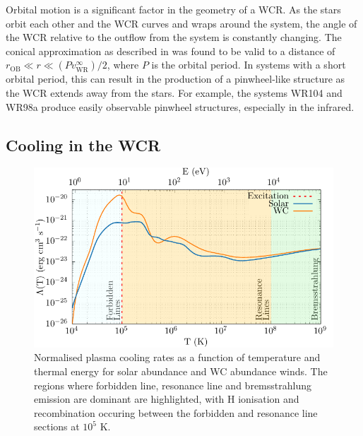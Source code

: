 Orbital motion is a significant factor in the geometry of a WCR.
As the stars orbit each other and the WCR curves and wraps around the system, the angle of the WCR relative to the outflow from the system is constantly changing.
The conical approximation as described in \textcite{eichler_particle_1993} was found to be valid to a distance of $r_\text{OB} \ll r \ll (P v^\infty_\text{WR})/2$, where $P$ is the orbital period.
In systems with a short orbital period, this can result in the production of a pinwheel-like structure as the WCR extends away from the stars.
For example, the systems WR104 and WR98a produce easily observable pinwheel structures, especially in the infrared.

\subsection{Cooling in the WCR}
\label{sec:wcrcooling}
\begin{figure}[h]
  \centering
  \includegraphics{assets/cooling-breakdown/cooling-curve-solar-withev.pdf}
  \caption[WC \& solar abundance plasma cooling curves]{Normalised plasma cooling rates as a function of temperature and thermal energy for solar abundance and WC abundance winds. The regions where forbidden line, resonance line and bremsstrahlung emission are dominant are highlighted, with H ionisation and recombination occuring between the forbidden and resonance line sections at $10^5$ \si{\kelvin}.}
  \label{fig:wcsolcooling}
\end{figure}

